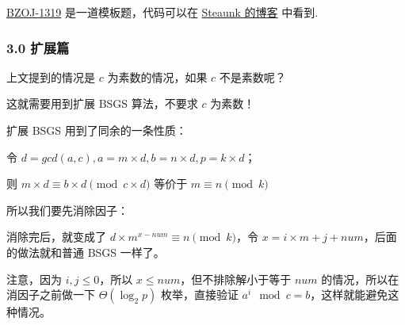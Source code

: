 \href{http://www.lydsy.com/JudgeOnline/problem.php?id=1319}{BZOJ-1319} 是一道模板题，代码可以在 \href{https://blog.csdn.net/Steaunk/article/details/78988376}{Steaunk 的博客} 中看到.

\subsubsection{3.0 扩展篇}

上文提到的情况是 $c$ 为素数的情况，如果 $c$ 不是素数呢？

这就需要用到扩展 BSGS 算法，不要求 $c$ 为素数！

扩展 BSGS 用到了同余的一条性质：

令 $d=gcd(a,c) ,a=m \times d,b=n \times d,p=k \times d$；

则 $m \times d \equiv b \times d \pmod {c \times d}$ 等价于 $m \equiv n \pmod k$

所以我们要先消除因子：


消除完后，就变成了 $d \times m^{x-num} \equiv n \pmod k$，令 $x=i \times m+j+num$，后面的做法就和普通 BSGS 一样了。

注意，因为 $i,j \le 0$，所以 $x \le num$，但不排除解小于等于 $num$ 的情况，所以在消因子之前做一下 $\Theta(\log_2 p)$ 枚举，直接验证 $a^i \mod c = b$，这样就能避免这种情况。
